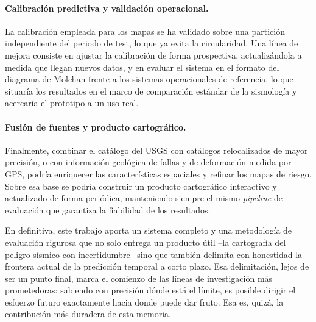 \paragraph{Calibración predictiva y validación operacional.} La calibración empleada para los
mapas se ha validado sobre una partición independiente del periodo de test, lo que ya evita la
circularidad. Una línea de mejora consiste en ajustar la calibración de forma prospectiva,
actualizándola a medida que llegan nuevos datos, y en evaluar el sistema en el formato del
diagrama de Molchan frente a los sistemas operacionales de referencia, lo que situaría los
resultados en el marco de comparación estándar de la sismología y acercaría el prototipo a un
uso real.

\paragraph{Fusión de fuentes y producto cartográfico.} Finalmente, combinar el catálogo del USGS
con catálogos relocalizados de mayor precisión, o con información geológica de fallas y de
deformación medida por GPS, podría enriquecer las características espaciales y refinar los mapas
de riesgo. Sobre esa base se podría construir un producto cartográfico interactivo y actualizado
de forma periódica, manteniendo siempre el mismo \textit{pipeline} de evaluación que garantiza la
fiabilidad de los resultados.

\medskip
En definitiva, este trabajo aporta un sistema completo y una metodología de evaluación rigurosa
que no solo entrega un producto útil --la cartografía del peligro sísmico con incertidumbre-- sino
que también delimita con honestidad la frontera actual de la predicción temporal a corto plazo.
Esa delimitación, lejos de ser un punto final, marca el comienzo de las líneas de investigación
más prometedoras: sabiendo con precisión dónde está el límite, es posible dirigir el esfuerzo
futuro exactamente hacia donde puede dar fruto. Esa es, quizá, la contribución más duradera de
esta memoria.
